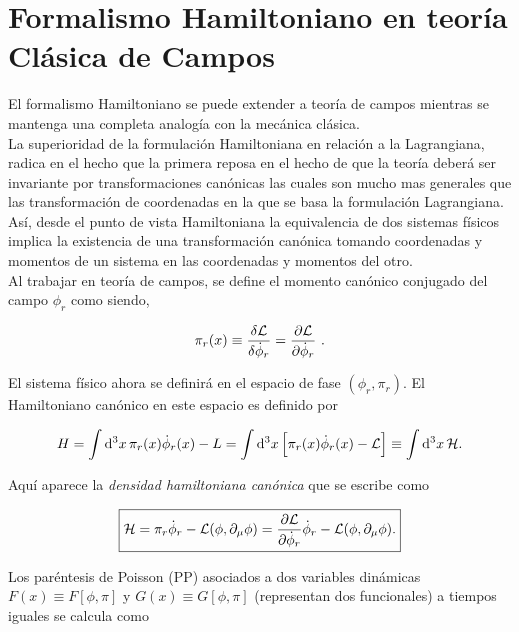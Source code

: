 \section{Formalismo Hamiltoniano en teoría Clásica de Campos}
\vspace{0.2cm}

El formalismo Hamiltoniano se puede extender a teoría de campos mientras se mantenga una completa analogía con la mecánica clásica.\\

La superioridad de la formulación Hamiltoniana en relación a la Lagrangiana, radica en el hecho que la primera reposa en el hecho de que la teoría deberá ser invariante por transformaciones canónicas las cuales son mucho mas generales que las transformación de coordenadas en la que se basa la formulación Lagrangiana. Así, desde el punto de vista Hamiltoniana la equivalencia de dos sistemas físicos implica la existencia de una transformación canónica tomando coordenadas y momentos de un sistema en las coordenadas y momentos del otro.\\

Al trabajar en teoría de campos, se define el momento canónico conjugado del campo $\phi_{r}$ como siendo,

\begin{equation}
    \pi_r (x) \equiv \fdv{\lagdn}{\dot{\phi}_r} = \pdv{\lagdn}{\dot{\phi}_r}~.
\end{equation}

El sistema físico ahora se definirá en el espacio de fase $(\phi_{r},\pi_{r})$. El Hamiltoniano canónico en este espacio es definido por

\begin{equation}
    H = \int \dd[3]{x} \pi_{r}(x)\dot{\phi}_r (x)-L = \int \dd[3]{x} \qty\Big[\pi_{r}(x)\dot{\phi}_r (x)-\mathcal{L}] \equiv \int \dd[3]{x} \mathcal{H}.
    \label{HC}
\end{equation}

Aquí aparece la \emph{densidad hamiltoniana canónica} que se escribe como

\begin{equation} \boxed{
    \mathcal{H} = \pi_{r} \dot{\phi}_r-\mathcal{L} \qty(\phi,\partial_{\mu}\phi) =\pdv{\mathcal{L}}{\dot{\phi}_r} \dot{\phi}_r-\mathcal{L} \qty(\phi,\partial_{\mu}\phi) .}
    \label{dHC}
\end{equation}

Los paréntesis de Poisson (PP) asociados a dos variables dinámicas $F(x) \equiv F[\phi,\pi]$ y $G(x) \equiv G[\phi,\pi]$ (representan dos funcionales) a tiempos iguales se calcula como

